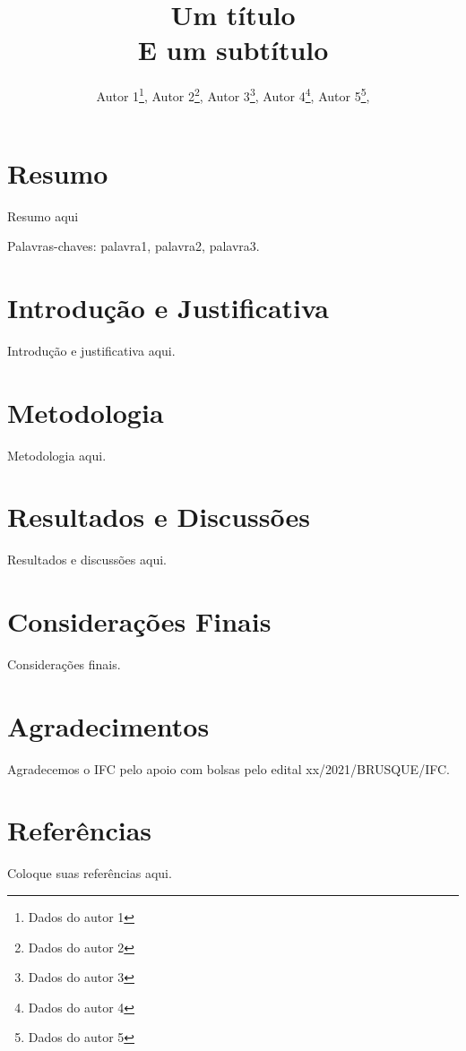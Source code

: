 \documentclass[a4paper,12pt]{article}
\title{
	Um título\\
	E um subtítulo
}
\author{
	Autor 1\footnote{Dados do autor 1},
	Autor 2\footnote{Dados do autor 2},
	Autor 3\footnote{Dados do autor 3},
	Autor 4\footnote{Dados do autor 4},
	Autor 5\footnote{Dados do autor 5},
}
\begin{document}
\maketitle

\section*{Resumo}
Resumo aqui

Palavras-chaves: palavra1, palavra2, palavra3.

\section*{Introdução e Justificativa}
Introdução e justificativa aqui.

\section*{Metodologia}
Metodologia aqui.

\section*{Resultados e Discussões}
Resultados e discussões aqui.

\section*{Considerações Finais}
Considerações finais.

\section*{Agradecimentos}
Agradecemos o IFC pelo apoio com bolsas pelo edital xx/2021/BRUSQUE/IFC.

\section*{Referências}
Coloque suas referências aqui.
\end{document}
